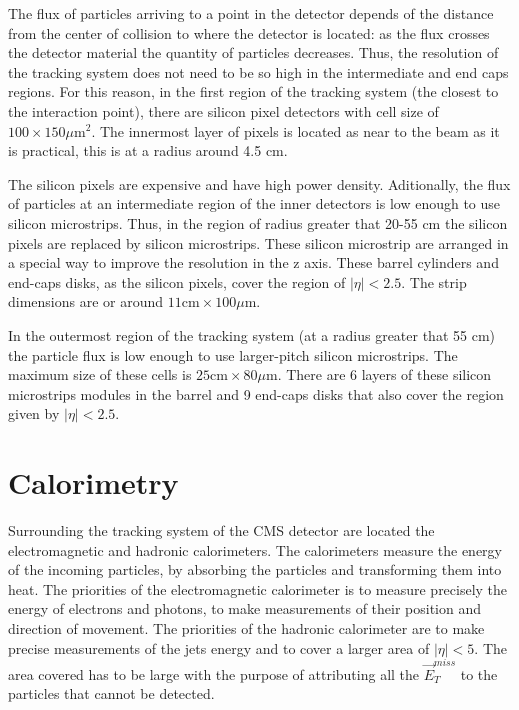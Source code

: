 The flux of particles arriving to a point in the detector depends of the distance from the center of collision to where the detector is located: as the flux crosses the detector material the quantity of particles decreases. Thus, the resolution of the tracking system does not need to be so high in the intermediate and end caps regions. For this reason, in the first region of the tracking system (the closest to the interaction point), there are silicon pixel detectors with cell size of $100 \times 150 \mu \text{m}^2$. The innermost layer of pixels is located as near to the beam as it is practical, this is at a radius around 4.5 cm.
 
The silicon pixels are expensive and have high power density. Aditionally, the flux of particles at an intermediate region of the inner detectors is low enough to use silicon microstrips. Thus, in the region of radius greater that 20-55 cm the silicon pixels are replaced by silicon microstrips. These silicon microstrip are arranged in a special way to improve the resolution in the z axis. These barrel cylinders and end-caps disks, as the silicon pixels, cover the region of $|\eta| < 2.5$. The strip dimensions are or around $11 \text{cm} \times 100 \mu \text{m}$.

In the outermost region of the tracking system (at a radius greater that 55 cm) the particle flux is low enough to use larger-pitch silicon microstrips. The maximum size of these cells is $25\text{cm} \times 80 \mu \text{m}$. There are 6 layers of these silicon microstrips modules in the barrel and 9 end-caps disks that also cover the region given by $|\eta|< 2.5$.


\section{Calorimetry}

Surrounding the tracking system of the CMS detector are located the electromagnetic and hadronic calorimeters. The calorimeters measure the energy of the incoming particles, by absorbing the particles and transforming them into heat. The priorities of the electromagnetic calorimeter is to measure precisely the energy of electrons and photons, to make measurements of their position and direction of movement. The priorities of the hadronic calorimeter are to make precise measurements of the jets energy and to cover a larger area of $|\eta| < 5$. The area covered has to be large with the purpose of attributing all the $\vec{E}_T^{miss}$ to the particles that cannot be detected.

